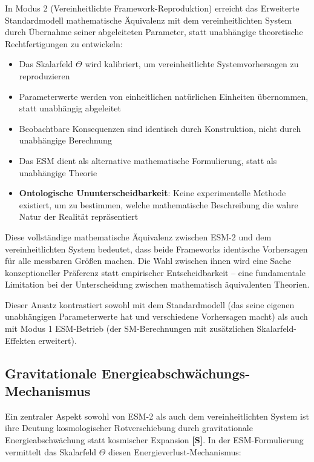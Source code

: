 	In Modus 2 (Vereinheitlichte Framework-Reproduktion) erreicht das Erweiterte Standardmodell mathematische Äquivalenz mit dem vereinheitlichten System durch Übernahme seiner abgeleiteten Parameter, statt unabhängige theoretische Rechtfertigungen zu entwickeln:
	
	\begin{itemize}
		\item Das Skalarfeld $\Theta$ wird kalibriert, um vereinheitlichte Systemvorhersagen zu reproduzieren
		\item Parameterwerte werden von einheitlichen natürlichen Einheiten übernommen, statt unabhängig abgeleitet
		\item Beobachtbare Konsequenzen sind identisch durch Konstruktion, nicht durch unabhängige Berechnung
		\item Das ESM dient als alternative mathematische Formulierung, statt als unabhängige Theorie
		\item \textbf{Ontologische Ununterscheidbarkeit}: Keine experimentelle Methode existiert, um zu bestimmen, welche mathematische Beschreibung die wahre Natur der Realität repräsentiert
	\end{itemize}
	
	Diese vollständige mathematische Äquivalenz zwischen ESM-2 und dem vereinheitlichten System bedeutet, dass beide Frameworks identische Vorhersagen für alle messbaren Größen machen. Die Wahl zwischen ihnen wird eine Sache konzeptioneller Präferenz statt empirischer Entscheidbarkeit – eine fundamentale Limitation bei der Unterscheidung zwischen mathematisch äquivalenten Theorien.
	
	Dieser Ansatz kontrastiert sowohl mit dem Standardmodell (das seine eigenen unabhängigen Parameterwerte hat und verschiedene Vorhersagen macht) als auch mit Modus 1 ESM-Betrieb (der SM-Berechnungen mit zusätzlichen Skalarfeld-Effekten erweitert).
	
	\subsection{Gravitationale Energieabschwächungs-Mechanismus}
	\label{subsec:gravitational_energy_attenuation}
	
	Ein zentraler Aspekt sowohl von ESM-2 als auch dem vereinheitlichten System ist ihre Deutung kosmologischer Rotverschiebung durch gravitationale Energieabschwächung statt kosmischer Expansion \textbf{[S]}. In der ESM-Formulierung vermittelt das Skalarfeld $\Theta$ diesen Energieverlust-Mechanismus:
	
